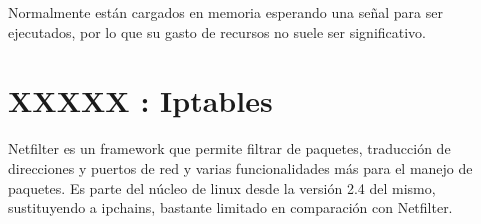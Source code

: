 Normalmente est\'an cargados en memoria esperando una se\~nal para ser ejecutados, por lo que su gasto de recursos no suele ser significativo.


%
%



\section{XXXXX : Iptables}


Netfilter es un framework que permite filtrar de paquetes, traducci\'on de direcciones y puertos de red y varias funcionalidades m\'as para el manejo de paquetes. Es parte del n\'ucleo de linux desde la versi\'on 2.4 del mismo, sustituyendo a ipchains, bastante limitado en comparaci\'on con Netfilter.

